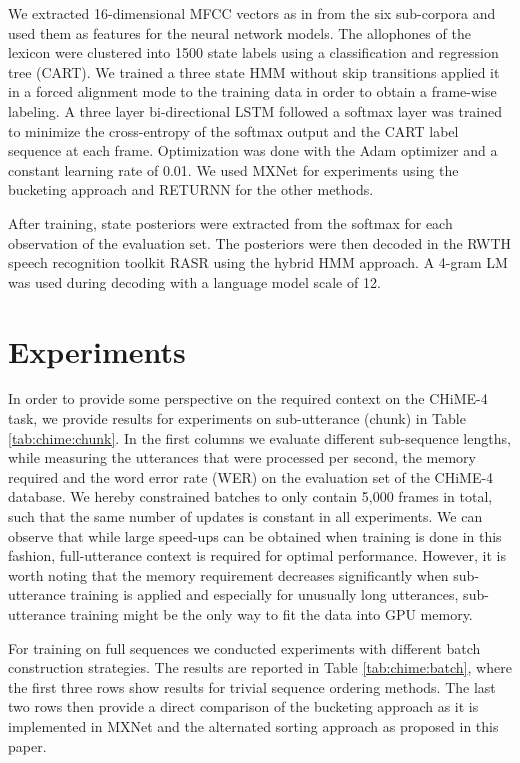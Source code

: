 \documentclass{article}
\begin{document}
  We extracted 16-dimensional MFCC vectors as in \cite{menne16:chime4System} from the six sub-corpora
  and used them as features for the neural network models. The allophones of the lexicon were clustered into 
  1500 state labels using a classification and regression tree (CART).
  We trained a three state HMM without skip transitions applied it in a forced alignment mode to the training data in order to obtain a frame-wise labeling. A three layer 
  bi-directional LSTM followed a softmax layer was trained to minimize the cross-entropy of the softmax output and the CART label sequence at each frame. Optimization was done with the Adam optimizer and a constant learning rate of 0.01. We used MXNet \cite{mxnet} for experiments using the bucketing approach and RETURNN \cite{doetsch2017:returnn} for the other methods.  
  
  After training, state posteriors were extracted from the softmax for each observation of the evaluation set. The posteriors were then decoded in the RWTH 
  speech recognition toolkit RASR \cite{rybach2011:rasr} using the hybrid HMM approach. A 4-gram LM 
  was used during decoding with a language model scale of 12.

  \section{Experiments} \label{sec:experiments}
   In order to provide some perspective on the required context on the CHiME-4 task, 
   we provide results for experiments on sub-utterance (chunk) in 
   Table \ref{tab:chime:chunk}. In the first columns we evaluate different sub-sequence lengths, while measuring the utterances that were processed per second, the memory required and the word error rate (WER) on the evaluation set of the CHiME-4 database. We hereby constrained batches to only 
   contain 5,000 frames in total, such that the same number of updates is constant in all experiments. We can observe that 
   while large speed-ups can be obtained when training is done in this fashion, full-utterance context is
   required for optimal performance. However, it is worth noting that the memory requirement decreases 
   significantly when sub-utterance training is applied and especially for unusually long utterances, 
   sub-utterance training might be the only way to fit the data into GPU memory.
   
   For training on full sequences we conducted experiments with different batch construction strategies.
   The results are reported in Table \ref{tab:chime:batch}, where the first three rows show results for trivial sequence ordering 
   methods. The last two rows then provide a direct comparison of the bucketing approach as 
   it is implemented in MXNet and the alternated sorting approach as proposed in this paper.
    
\end{document}
